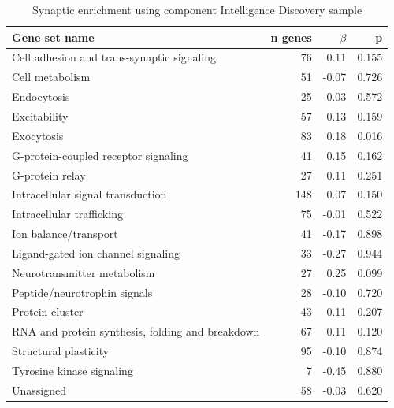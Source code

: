 \begin{table}[ht]
\centering
\begin{tabular}{lrrr}
  \toprule 
Gene set name & n genes & $\beta$ & p\\
  \midrule
Cell adhesion and trans-synaptic signaling & 76 & 0.11 & 0.155 \\ 
  Cell metabolism & 51 & -0.07 & 0.726 \\ 
  Endocytosis & 25 & -0.03 & 0.572 \\ 
  Excitability & 57 & 0.13 & 0.159 \\ 
  Exocytosis & 83 & 0.18 & 0.016 \\ 
  G-protein-coupled receptor signaling & 41 & 0.15 & 0.162 \\ 
  G-protein relay & 27 & 0.11 & 0.251 \\ 
  Intracellular signal transduction & 148 & 0.07 & 0.150 \\ 
  Intracellular trafficking & 75 & -0.01 & 0.522 \\ 
  Ion balance/transport & 41 & -0.17 & 0.898 \\ 
  Ligand-gated ion channel signaling & 33 & -0.27 & 0.944 \\ 
  Neurotransmitter metabolism & 27 & 0.25 & 0.099 \\ 
  Peptide/neurotrophin signals & 28 & -0.10 & 0.720 \\ 
  Protein cluster & 43 & 0.11 & 0.207 \\ 
  RNA and protein synthesis, folding and breakdown & 67 & 0.11 & 0.120 \\ 
  Structural plasticity & 95 & -0.10 & 0.874 \\ 
  Tyrosine kinase signaling & 7 & -0.45 & 0.880 \\ 
  Unassigned & 58 & -0.03 & 0.620 \\ 
   \bottomrule
\end{tabular}
\caption{Synaptic enrichment using component Intelligence Discovery sample} 
\label{tab:MAGMA enrichment of synaptic groups ctg}
\end{table}

